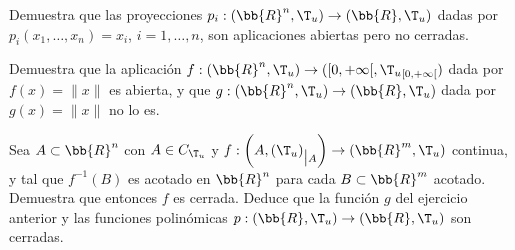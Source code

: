 \begin{ejercicio}
    Demuestra que las proyecciones $p_i: (\bb{R}^n, \T_u) \to (\bb{R}, \T_u)$ dadas por $p_i(x_1, \dots , x_n) = x_i$, $i = 1, \dots, n$, son aplicaciones abiertas pero no cerradas.
\end{ejercicio}

\begin{ejercicio}
    Demuestra que la aplicación $f : (\bb{R}^n, \T_u) \to ([0, +\infty[,{\T_u}_{[0,+\infty[})$ dada por $f(x) = \|x\|$ es abierta, y que $g : (\bb{R}^n, \T_u) \to (\bb{R}, \T_u)$ dada por $g(x) = \|x\|$ no lo es.
\end{ejercicio}

\begin{ejercicio}
    Sea $A \subset \bb{R}^n$ con $A \in C_{\T_u}$ y $f : \left(A,{(\T_u)}_{\big|A}\right) \to (\bb{R}^m, \T_u)$ continua, y tal que $f^{-1}(B)$ es acotado en $\bb{R}^n$ para cada $B \subset \bb{R}^m$ acotado. Demuestra que entonces $f$ es cerrada.
    Deduce que la función $g$ del ejercicio anterior y las funciones polinómicas $p : (\bb{R}, \T_u) \to (\bb{R}, \T_u)$ son cerradas.
\end{ejercicio}

